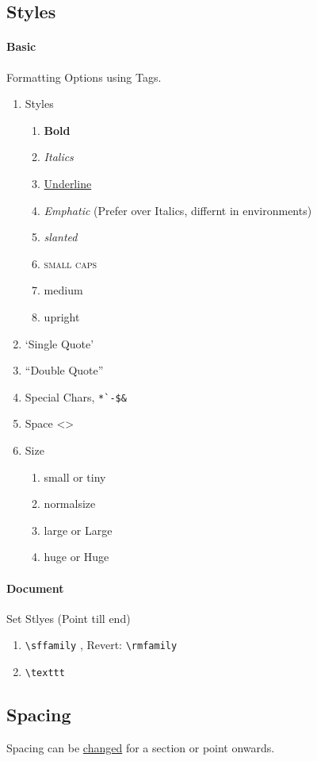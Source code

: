 \documentclass{report}[a4paper,12pt] %
\begin{document}
\subsection{Styles}
\paragraph{Basic} Formatting Options using Tags.
\begin{enumerate}
  \item Styles
  \begin{enumerate}
    \item \textbf{Bold}
    \item \textit{Italics}
    \item \underline{Underline}
    \item \emph{Emphatic} (Prefer over Italics, differnt in environments)
    \item \textsl{slanted}
    \item \textsc{small caps}
    \item \textmd{medium}
    \item \textup{upright}
  \end{enumerate}
  \item `Single Quote'
  \item ``Double Quote''
  \item Special Chars, \verb|*`-$&|
  \item Space <\space>
  \item Size
  \begin{enumerate}
    \item \small small or \tiny tiny
    \item \normalsize normalsize
    \item \large large or \Large Large
    \item \huge huge or \Huge Huge
  \end{enumerate}
\end{enumerate}

\paragraph{Document} Set Stlyes (Point till end)
\begin{enumerate}
  \item \verb|\sffamily| , Revert: \verb|\rmfamily|
  \item \verb|\texttt| 
\end{enumerate}

\subsection{Spacing} 
Spacing can be \href{https://www.overleaf.com/learn/latex/Articles/How_to_change_paragraph_spacing_in_LaTeX}{changed} for a section or point onwards.
\end{document}
